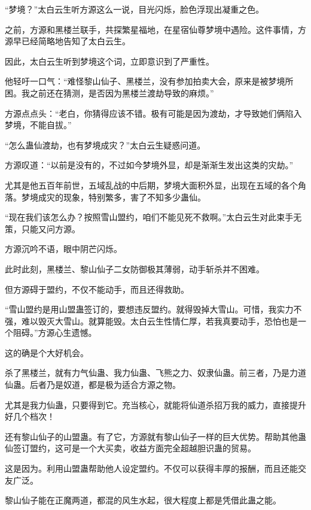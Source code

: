
\begin{this_body}



“梦境？”太白云生听方源这么一说，目光闪烁，脸色浮现出凝重之色。

之前，方源和黑楼兰联手，共探繁星福地，在星宿仙尊梦境中遇险。这件事情，方源早已经简略地告知了太白云生。

因此，太白云生听到梦境这个词，立即意识到了严重性。

他轻吁一口气：“难怪黎山仙子、黑楼兰，没有参加拍卖大会，原来是被梦境所困。我之前还在猜测，是否因为黑楼兰渡劫导致的麻烦。”

方源点点头：“老白，你猜得应该不错。极有可能是因为渡劫，才导致她们俩陷入梦境，不能自拔。”

“怎么蛊仙渡劫，也有梦境成灾？”太白云生疑惑问道。

方源叹道：“以前是没有的，不过如今梦境外显，却是渐渐生发出这类的灾劫。”

尤其是他五百年前世，五域乱战的中后期，梦境大面积外显，出现在五域的各个角落。梦境成灾的现象，特别繁多，害了不知多少蛊仙。

“现在我们该怎么办？按照雪山盟约，咱们不能见死不救啊。”太白云生对此束手无策，只能又问方源。

方源沉吟不语，眼中阴芒闪烁。

此时此刻，黑楼兰、黎山仙子二女防御极其薄弱，动手斩杀并不困难。

但方源碍于盟约，不仅不能动手，而且还得救助。

“雪山盟约是用山盟蛊签订的，要想违反盟约。就得毁掉大雪山。可惜，我实力不强，难以毁灭大雪山。就算能毁。太白云生性情仁厚，若我真要动手，恐怕也是一个阻碍。”方源心生遗憾。

这的确是个大好机会。

杀了黑楼兰，就有力气仙蛊、我力仙蛊、飞熊之力、奴隶仙蛊。前三者，乃是力道仙蛊。后者乃是奴道，都是极为适合方源之物。

尤其是我力仙蛊，只要得到它。充当核心，就能将仙道杀招万我的威力，直接提升好几个档次！

还有黎山仙子的山盟蛊。有了它，方源就有黎山仙子一样的巨大优势。帮助其他蛊仙签订盟约，这可是一个大买卖，收益方面完全超越胆识蛊的贸易。

这是因为。利用山盟蛊帮助他人设定盟约。不仅可以获得丰厚的报酬，而且还能交友广泛。

黎山仙子能在正魔两道，都混的风生水起，很大程度上都是凭借此蛊之能。


\end{this_body}
